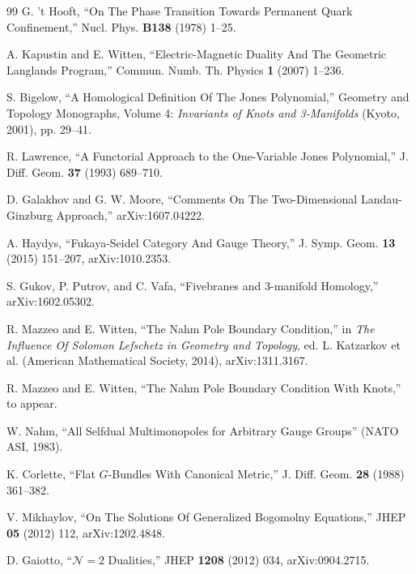 \begin{thebibliography}{99}
 G. 't Hooft, ``On The Phase Transition Towards Permanent Quark Confinement,''
  Nucl. Phys. \textbf{B138} (1978) 1--25.

 A. Kapustin and E. Witten, ``Electric-Magnetic Duality And The Geometric Langlands Program,''
  Commun. Numb. Th. Physics \textbf{1} (2007) 1--236.

 S. Bigelow, ``A Homological Definition Of The Jones Polynomial,''
  Geometry and Topology Monographs, Volume 4: \emph{Invariants of Knots and 3-Manifolds}
  (Kyoto, 2001), pp. 29--41.

 R. Lawrence, ``A Functorial Approach to the One-Variable Jones Polynomial,''
  J. Diff. Geom. \textbf{37} (1993) 689--710.

 D. Galakhov and G. W. Moore, ``Comments On The Two-Dimensional
  Landau-Ginzburg Approach,'' arXiv:1607.04222.

 A. Haydys, ``Fukaya-Seidel Category And Gauge Theory,''
  J. Symp. Geom. \textbf{13} (2015) 151--207, arXiv:1010.2353.

 S. Gukov, P. Putrov, and C. Vafa, ``Fivebranes and 3-manifold Homology,''
  arXiv:1602.05302.

 R. Mazzeo and E. Witten, ``The Nahm Pole Boundary Condition,''
  in \emph{The Influence Of Solomon Lefschetz in Geometry and Topology},
  ed. L. Katzarkov et al. (American Mathematical Society, 2014), arXiv:1311.3167.

 R. Mazzeo and E. Witten, ``The Nahm Pole Boundary Condition With Knots,''
  to appear.

 W. Nahm, ``All Selfdual Multimonopoles for Arbitrary Gauge Groups''
  (NATO ASI, 1983).

 K. Corlette, ``Flat $G$-Bundles With Canonical Metric,''
  J. Diff. Geom. \textbf{28} (1988) 361--382.

 V. Mikhaylov, ``On The Solutions Of Generalized Bogomolny Equations,''
  JHEP \textbf{05} (2012) 112, arXiv:1202.4848.

 D. Gaiotto, ``$\mathcal{N}=2$ Dualities,'' JHEP \textbf{1208} (2012) 034,
  arXiv:0904.2715.

\end{thebibliography}



